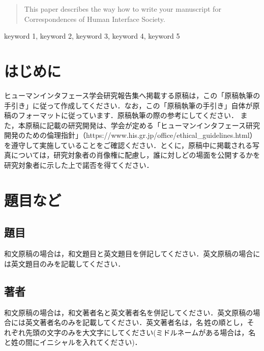 \documentclass{hisken}
\begin{document}

\begin{abstract}
This paper describes the way how to write your manuscript for Correspondences of Human Interface Society.
\end{abstract}

\begin{keyword}	
keyword 1, keyword 2, keyword 3, keyword 4, keyword 5
\end{keyword}

\maketitle	

\section{はじめに}
ヒューマンインタフェース学会研究報告集へ掲載する原稿は，この「原稿執筆の手引き」に従って作成してください．なお，この「原稿執筆の手引き」自体が原稿のフォーマットに従っています．原稿執筆の際の参考にしてください．
また，本原稿に記載の研究開発は、学会が定める「ヒューマンインタフェース研究開発のための倫理指針」（https://www.his.gr.jp/office/ethical\_guidelines.html） を遵守して実施していることをご確認ください．とくに，原稿中に掲載される写真については，研究対象者の肖像権に配慮し，誰に対しどの場面を公開するかを研究対象者に示した上で諾否を得てください．


\section{題目など}

\subsection{題目}
和文原稿の場合は，和文題目と英文題目を併記してください．英文原稿の場合には英文題目のみを記載してください．

\subsection{著者}
和文原稿の場合は，和文著者名と英文著者名を併記してください．英文原稿の場合には英文著者名のみを記載してください．英文著者名は，名\,姓の順とし，それぞれ先頭の文字のみを大文字にしてください(ミドルネームがある場合は，名と姓の間にイニシャルを入れてください)．
\end{document}
